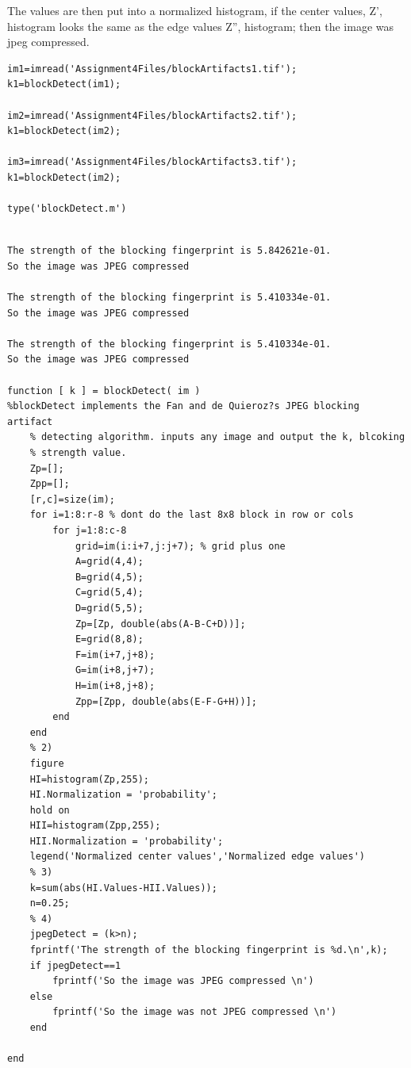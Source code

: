 \documentclass{article}
\begin{document}
The values are then put into a normalized histogram, if the center values,
Z', histogram looks the same as the edge values Z'', histogram; then
the image was jpeg compressed.


\begin{verbatim}
im1=imread('Assignment4Files/blockArtifacts1.tif');
k1=blockDetect(im1);

im2=imread('Assignment4Files/blockArtifacts2.tif');
k1=blockDetect(im2);

im3=imread('Assignment4Files/blockArtifacts3.tif');
k1=blockDetect(im2);

type('blockDetect.m')
\end{verbatim}

        \color{lightgray} \begin{verbatim}

The strength of the blocking fingerprint is 5.842621e-01.
So the image was JPEG compressed 

The strength of the blocking fingerprint is 5.410334e-01.
So the image was JPEG compressed 

The strength of the blocking fingerprint is 5.410334e-01.
So the image was JPEG compressed 

function [ k ] = blockDetect( im )
%blockDetect implements the Fan and de Quieroz?s JPEG blocking artifact
    % detecting algorithm. inputs any image and output the k, blcoking 
    % strength value. 
    Zp=[]; 
    Zpp=[];
    [r,c]=size(im); 
    for i=1:8:r-8 % dont do the last 8x8 block in row or cols 
        for j=1:8:c-8
            grid=im(i:i+7,j:j+7); % grid plus one 
            A=grid(4,4); 
            B=grid(4,5); 
            C=grid(5,4); 
            D=grid(5,5); 
            Zp=[Zp, double(abs(A-B-C+D))]; 
            E=grid(8,8); 
            F=im(i+7,j+8); 
            G=im(i+8,j+7); 
            H=im(i+8,j+8); 
            Zpp=[Zpp, double(abs(E-F-G+H))]; 
        end 
    end 
    % 2)
    figure 
    HI=histogram(Zp,255); 
    HI.Normalization = 'probability'; 
    hold on 
    HII=histogram(Zpp,255); 
    HII.Normalization = 'probability'; 
    legend('Normalized center values','Normalized edge values')
    % 3)
    k=sum(abs(HI.Values-HII.Values)); 
    n=0.25; 
    % 4) 
    jpegDetect = (k>n); 
    fprintf('The strength of the blocking fingerprint is %d.\n',k); 
    if jpegDetect==1
        fprintf('So the image was JPEG compressed \n')
    else
        fprintf('So the image was not JPEG compressed \n')
    end

end

\end{verbatim} \color{black}
\end{document}
